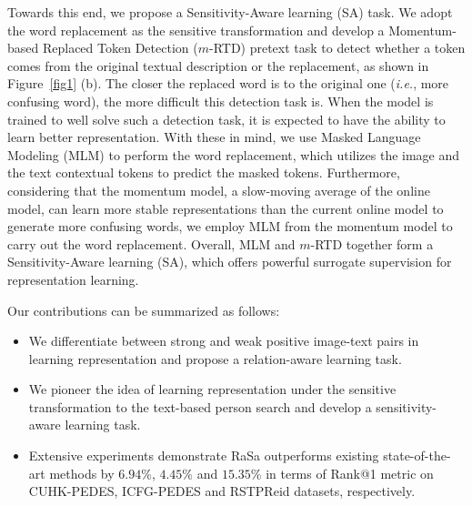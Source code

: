 \documentclass{article}
\begin{document}
Towards this end, we propose a Sensitivity-Aware learning (SA) task.
We adopt the word replacement as the sensitive transformation and develop a Momentum-based Replaced Token Detection ($m$-RTD) pretext task to detect whether a token comes from the original textual description or the replacement, as shown in Figure~\ref{fig1} (b).
The closer the replaced word is to the original one (\emph{i.e.}, more confusing word), the more difficult this detection task is. 
When the model is trained to well solve such a detection task, it is expected to have the ability to learn better representation.
With these in mind, we use Masked Language Modeling (MLM) to perform the word replacement, which utilizes the image and the text contextual tokens to predict the masked tokens.
Furthermore, considering that the momentum model, a slow-moving average of the online model, can learn more stable representations than the current online model \cite{grill2020bootstrap} to generate more confusing words, we employ MLM from the momentum model to carry out the word replacement.
Overall, MLM and $m$-RTD together form a Sensitivity-Aware learning (SA), which offers powerful surrogate supervision for representation learning.

Our contributions can be summarized as follows:
\begin{itemize}
\item We differentiate between strong and weak positive image-text pairs in learning representation and propose a relation-aware learning task.
\item We pioneer the idea of learning representation under the sensitive transformation to the text-based person search and develop a sensitivity-aware learning task.
\item 
Extensive experiments demonstrate RaSa outperforms existing state-of-the-art methods by $6.94$\%, $4.45$\% and $15.35$\% in terms of Rank@1 metric on CUHK-PEDES, ICFG-PEDES and RSTPReid datasets, respectively.
\end{itemize}
\end{document}
